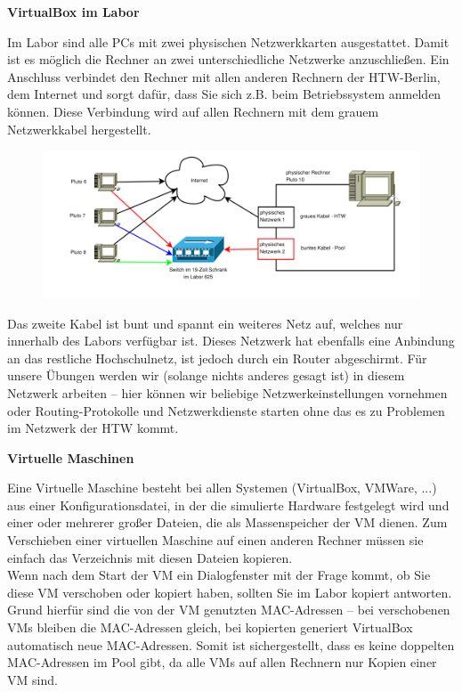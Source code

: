 \documentclass[paper=a4,fontsize=11pt]{scrartcl}%
\numberwithin{equation}{section}
\begin{document}
\begin{center}
\Large{\textbf{VirtualBox im Labor}}
\end{center}
Im Labor sind alle PCs mit zwei physischen Netzwerkkarten ausgestattet. Damit ist es möglich die Rechner an zwei unterschiedliche Netzwerke anzuschließen. Ein Anschluss verbindet den Rechner mit allen anderen Rechnern der HTW-Berlin, dem Internet und sorgt dafür, dass Sie sich z.B. beim Betriebssystem anmelden können. Diese Verbindung wird auf allen Rechnern mit dem grauem Netzwerkkabel hergestellt.
\begin{figure}[H]
	\centering
	\includegraphics[scale=0.4]{wh_c_625}
\end{figure}
Das zweite Kabel ist bunt und spannt ein weiteres Netz auf, welches nur innerhalb des Labors verfügbar ist. Dieses Netzwerk hat ebenfalls eine Anbindung an das restliche Hochschulnetz, ist jedoch durch ein Router abgeschirmt. Für unsere Übungen werden wir (solange nichts anderes gesagt ist) in diesem Netzwerk arbeiten -- hier können wir beliebige Netzwerkeinstellungen vornehmen oder Routing-Protokolle und Netzwerkdienste starten ohne das es zu Problemen im Netzwerk der HTW kommt.
\begin{center}
\Large{\textbf{Virtuelle Maschinen}}
\end{center}
Eine Virtuelle Maschine besteht bei allen Systemen (VirtualBox, VMWare, ...) aus einer Konfigurationsdatei, in der die simulierte Hardware festgelegt wird und einer oder mehrerer großer Dateien, die als Massenspeicher der VM dienen. Zum Verschieben einer virtuellen Maschine auf einen anderen Rechner müssen sie einfach das Verzeichnis mit diesen Dateien kopieren.\\

Wenn nach dem Start der VM ein Dialogfenster mit der Frage kommt, ob Sie diese VM verschoben oder kopiert haben, sollten Sie im Labor kopiert antworten. Grund hierfür sind die von der VM genutzten MAC-Adressen -- bei verschobenen VMs bleiben die MAC-Adressen gleich, bei  kopierten generiert VirtualBox automatisch neue MAC-Adressen. Somit ist sichergestellt, dass es keine doppelten MAC-Adressen im Pool gibt, da alle VMs auf allen Rechnern nur Kopien einer VM sind.\\
\end{document}
